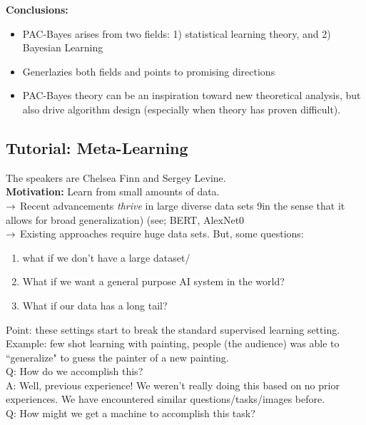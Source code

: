 {\bf Conclusions:}
\begin{itemize}
    \item PAC-Bayes arises from two fields: 1) statistical learning theory, and 2) Bayesian Learning
    \item Generlazies both fields and points to promising directions
    \item PAC-Bayes theory can be an inspiration toward new theoretical analysis, but also drive algorithm design (especially when theory has proven difficult).
\end{itemize}


\subsection{Tutorial: Meta-Learning}

The speakers are Chelsea Finn and Sergey Levine. \\

{\bf Motivation:} Learn from small amounts of data. \\

$\rightarrow$ Recent advancements {\it thrive} in large diverse data sets 9in the sense that it allows for broad generalization) (see; BERT, AlexNet0 \\

$\rightarrow$ Existing approaches require huge data sets. But, some questions:
\begin{enumerate}
\item  what if we don't have a large dataset/
\item What if we want a general purpose AI system in the world?
\item What if our data has a long tail?
\end{enumerate}

Point: these settings start to break the standard supervised learning setting. \\

Example: few shot learning with painting, people (the audience) was able to ``generalize" to guess the painter of a new painting. \\

Q: How do we accomplish this? \\

A: Well, previous experience! We weren't really doing this based on no prior experiences. We have encountered similar questions/tasks/images before. \\

Q: How might we get a machine to accomplish this task?  \\

